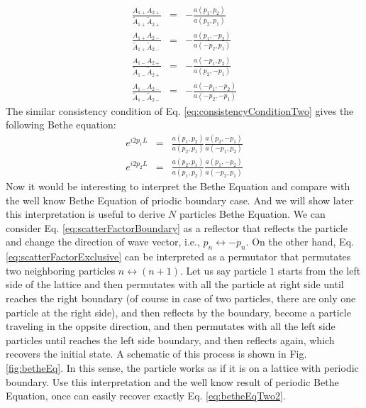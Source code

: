 \begin{subequations}
    \label{eq:scatterFactorExclusive2}
    \begin{align}
        \frac{A_{1+}A_{2+}}{\tilde{A}_{1+}\tilde{A}_{2+}} & = & 
        -\frac{a(p_1, p_2)}{a(p_2, p_1)} \\
        \frac{A_{1+}A_{2-}}{\tilde{A}_{1+}\tilde{A}_{2-}} & = & 
        -\frac{a(p_1, -p_2)}{a(-p_2, p_1)} \\
        \frac{A_{1-}A_{2+}}{\tilde{A}_{1-}\tilde{A}_{2+}} & = & 
        -\frac{a(-p_1, p_2)}{a(p_2, -p_1)} \\
        \frac{A_{1-}A_{2-}}{\tilde{A}_{1-}\tilde{A}_{2-}} & = & 
        -\frac{a(-p_1, -p_2)}{a(-p_2, -p_1)}
    \end{align}
\end{subequations}
The similar consistency condition of Eq. \eqref{eq:consistencyConditionTwo}
gives the following Bethe equation:
\begin{subequations}
    \label{eq:betheEqTwo2}
    \begin{align}
        e^{i2p_1L} & = & \frac{a(p_1, p_2)}{a(p_2, p_1)} 
        \frac{a(p_2, -p_1)}{a(-p_1, p_2)}\\
        e^{i2p_2L} & = & \frac{a(p_2, p_1)}{a(p_1, p_2)} 
        \frac{a(p_1, -p_2)}{a(-p_2, p_1)}
    \end{align}
\end{subequations}
Now it would be interesting to interpret the Bethe Equation and compare with
the well know Bethe Equation of priodic boundary case. And we will show later
this interpretation is useful to derive $N$ particles Bethe Equation. We can
consider Eq.  \eqref{eq:scatterFactorBoundary} as a reflector that reflects the
particle and change the direction of wave vector, i.e., $p_n\leftrightarrow-p_n$.
On the other hand, Eq. \eqref{eq:scatterFactorExclusive} can be interpreted as
a permutator that permutates two neighboring particles $n\leftrightarrow (n+1)$.
Let us say particle $1$ starts from the left side of the lattice and then
permutates with all the particle at right side until reaches the right boundary
(of course in case of two particles, there are only one particle at the right
side), and then reflects by the boundary, become a particle traveling in the
oppsite direction, and then permutates with all the left side particles until
reaches the left side boundary, and then reflects again, which recovers the
initial state. A schematic of this process is shown in Fig.
\ref{fig:betheEq}. In this sense, the particle works as if it is on a
lattice with periodic boundary. Use this interpretation and the well know result
of periodic Bethe Equation, once can easily recover exactly Eq.
\eqref{eq:betheEqTwo2}. 

